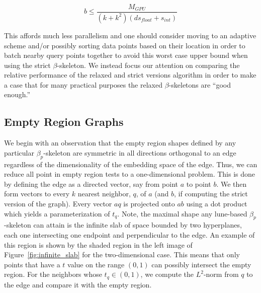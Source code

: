 \begin{equation}
    b \leq \frac{M_{GPU}}{(k+k^2)\left(ds_{float} + s_{int}\right)}
\end{equation}

This affords much less parallelism and one should consider moving to an adaptive scheme and/or possibly sorting data points based on their location in order to batch nearby query points together to avoid this worst case upper bound when using the strict $\beta$-skeleton.
%
We instead focus our attention on comparing the relative performance of the relaxed and strict versions algorithm in order to make a case that for many practical purposes the relaxed $\beta$-skeletons are ``good enough.''


\subsection{Empty Region Graphs}
We begin with an observation that the empty region shapes defined by any particular $\beta_p$-skeleton are symmetric in all directions orthogonal to an edge regardless of the dimensionality of the embedding space of the edge.
%
Thus, we can reduce all point in empty region tests to a one-dimensional problem.
%
This is done by defining the edge as a directed vector, say from point $a$ to point $b$.
%
We then form vectors to every $k$ nearest neighbor, $q$, of $a$ (and $b$, if computing the strict version of the graph).
%
Every vector $aq$ is projected onto $ab$ using a dot product which yields a parameterization of $t_q$.
%
Note, the maximal shape any lune-based $\beta_p$-skeleton can attain is the infinite slab of space bounded by two hyperplanes, each one intersecting one endpoint and perpendicular to the edge.
%
An example of this region is shown by the shaded region in the left image of Figure~\ref{fig:infinite_slab} for the two-dimensional case.
%
This means that only points that have a $t$ value on the range $(0,1)$ can possibly intersect the empty region.
%
For the neighbors whose $t_q \in (0,1)$, we compute the $L^2$-norm from $q$ to the edge and compare it with the empty region.

